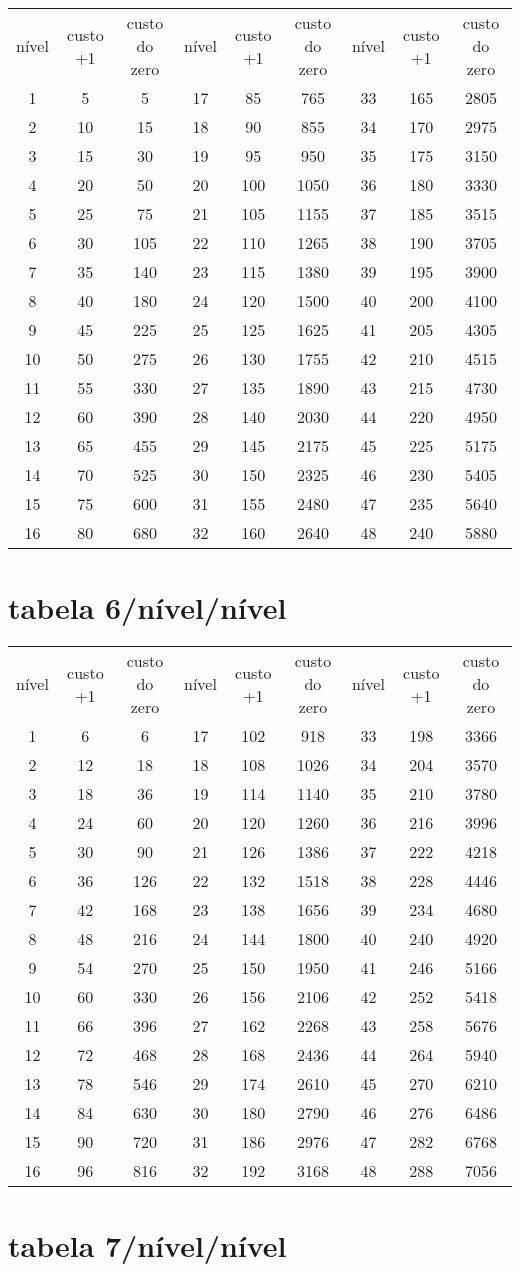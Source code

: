\begin{longtable}{|c|c|c|c|c|c|c|c|c|}
    nível&custo +1&custo do zero&nível&custo +1&custo do zero&nível&custo +1&custo do zero\tabularnewline 
     1 & 5 & 5 & 17 & 85 & 765 & 33 & 165 & 2805 \tabularnewline 
     2 & 10 & 15 & 18 & 90 & 855 & 34 & 170 & 2975 \tabularnewline 
     3 & 15 & 30 & 19 & 95 & 950 & 35 & 175 & 3150 \tabularnewline 
     4 & 20 & 50 & 20 & 100 & 1050 & 36 & 180 & 3330 \tabularnewline 
     5 & 25 & 75 & 21 & 105 & 1155 & 37 & 185 & 3515 \tabularnewline 
     6 & 30 & 105 & 22 & 110 & 1265 & 38 & 190 & 3705 \tabularnewline 
     7 & 35 & 140 & 23 & 115 & 1380 & 39 & 195 & 3900 \tabularnewline 
     8 & 40 & 180 & 24 & 120 & 1500 & 40 & 200 & 4100 \tabularnewline 
     9 & 45 & 225 & 25 & 125 & 1625 & 41 & 205 & 4305 \tabularnewline 
     10 & 50 & 275 & 26 & 130 & 1755 & 42 & 210 & 4515 \tabularnewline 
     11 & 55 & 330 & 27 & 135 & 1890 & 43 & 215 & 4730 \tabularnewline 
     12 & 60 & 390 & 28 & 140 & 2030 & 44 & 220 & 4950 \tabularnewline 
     13 & 65 & 455 & 29 & 145 & 2175 & 45 & 225 & 5175 \tabularnewline 
     14 & 70 & 525 & 30 & 150 & 2325 & 46 & 230 & 5405 \tabularnewline 
     15 & 75 & 600 & 31 & 155 & 2480 & 47 & 235 & 5640 \tabularnewline 
     16 & 80 & 680 & 32 & 160 & 2640 & 48 & 240 & 5880 \tabularnewline  
\end{longtable} \section{tabela 6/nível/nível} 
\begin{longtable}{|c|c|c|c|c|c|c|c|c|}
    nível&custo +1&custo do zero&nível&custo +1&custo do zero&nível&custo +1&custo do zero\tabularnewline 
     1 & 6 & 6 & 17 & 102 & 918 & 33 & 198 & 3366 \tabularnewline 
     2 & 12 & 18 & 18 & 108 & 1026 & 34 & 204 & 3570 \tabularnewline 
     3 & 18 & 36 & 19 & 114 & 1140 & 35 & 210 & 3780 \tabularnewline 
     4 & 24 & 60 & 20 & 120 & 1260 & 36 & 216 & 3996 \tabularnewline 
     5 & 30 & 90 & 21 & 126 & 1386 & 37 & 222 & 4218 \tabularnewline 
     6 & 36 & 126 & 22 & 132 & 1518 & 38 & 228 & 4446 \tabularnewline 
     7 & 42 & 168 & 23 & 138 & 1656 & 39 & 234 & 4680 \tabularnewline 
     8 & 48 & 216 & 24 & 144 & 1800 & 40 & 240 & 4920 \tabularnewline 
     9 & 54 & 270 & 25 & 150 & 1950 & 41 & 246 & 5166 \tabularnewline 
     10 & 60 & 330 & 26 & 156 & 2106 & 42 & 252 & 5418 \tabularnewline 
     11 & 66 & 396 & 27 & 162 & 2268 & 43 & 258 & 5676 \tabularnewline 
     12 & 72 & 468 & 28 & 168 & 2436 & 44 & 264 & 5940 \tabularnewline 
     13 & 78 & 546 & 29 & 174 & 2610 & 45 & 270 & 6210 \tabularnewline 
     14 & 84 & 630 & 30 & 180 & 2790 & 46 & 276 & 6486 \tabularnewline 
     15 & 90 & 720 & 31 & 186 & 2976 & 47 & 282 & 6768 \tabularnewline 
     16 & 96 & 816 & 32 & 192 & 3168 & 48 & 288 & 7056 \tabularnewline  
\end{longtable} \section{tabela 7/nível/nível} 
